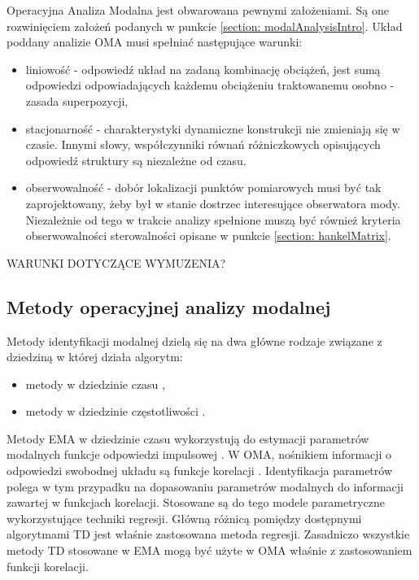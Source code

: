 Operacyjna Analiza Modalna jest obwarowana pewnymi założeniami. Są one rozwinięciem założeń podanych w punkcie \ref{section: modalAnalysisIntro}. Układ poddany analizie OMA musi spełniać następujące warunki:
\begin{itemize}
	\item liniowość - odpowiedź układ na zadaną kombinację obciążeń, jest sumą odpowiedzi odpowiadających każdemu obciążeniu traktowanemu osobno - zasada superpozycji,
	\item stacjonarność - charakterystyki dynamiczne konstrukcji nie zmieniają się w czasie. Innymi słowy, współczynniki równań różniczkowych opisujących odpowiedź struktury są niezależne od czasu.
	\item obserwowalność - dobór lokalizacji punktów pomiarowych musi być tak zaprojektowany, żeby był w stanie dostrzec interesujące obserwatora mody. Niezależnie od tego w trakcie analizy spełnione muszą być również kryteria obserwowalności sterowalności opisane w punkcie \ref{section: hankelMatrix}.
\end{itemize}


WARUNKI DOTYCZĄCE WYMUZENIA? \cite{Rainieri2014}

\subsection{Metody operacyjnej analizy modalnej}

Metody identyfikacji modalnej dzielą się na dwa główne rodzaje związane z dziedziną w której działa algorytm:
\begin{itemize}[noitemsep]
	\item metody w dziedzinie czasu ,
	\item metody w dziedzinie częstotliwości .
\end{itemize}
Metody EMA w dziedzinie czasu wykorzystują do estymacji parametrów modalnych funkcje odpowiedzi impulsowej . W OMA, nośnikiem informacji o odpowiedzi swobodnej układu  są funkcje korelacji . Identyfikacja parametrów polega w tym przypadku na dopasowaniu parametrów modalnych do informacji zawartej w funkcjach korelacji. Stosowane są do tego modele parametryczne wykorzystujące techniki regresji. Główną różnicą pomiędzy dostępnymi algorytmami TD jest właśnie zastosowana metoda regresji. Zasadniczo wszystkie metody TD stosowane w EMA mogą być użyte w OMA właśnie z zastosowaniem funkcji korelacji. 


